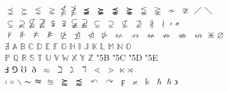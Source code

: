 \documentclass{article}
\begin{document}
$\precnsim$ $\succnsim$ $\lnsim$ $\gnsim$ $\nleqq$ $\ngeqq$ $\precneqq$ $\succneqq$ $\precnapprox$ $\succnapprox$ $\lnapprox$ $\gnapprox$ $\nsim$ $\ncong$ $\diagup$ $\diagdown$\\
$\varsubsetneq$ $\varsupsetneq$ $\nsubseteqq$ $\nsupseteqq$ $\subsetneqq$ $\supsetneqq$ $\varsubsetneqq$ $\varsupsetneqq$ $\subsetneq$ $\supsetneq$ $\nsubseteq$ $\nsupseteq$ $\nparallel$ $\nmid$ $\nshortmid$ $\nshortparallel$\\
$\nvdash$ $\nVdash$ $\nvDash$ $\nVDash$ $\ntrianglerighteq$ $\ntrianglelefteq$ $\ntriangleleft$ $\ntriangleright$ $\nleftarrow$ $\nrightarrow$ $\nLeftarrow$ $\nRightarrow$ $\nLeftrightarrow$ $\nleftrightarrow$ $\divideontimes$ $\varnothing$\\
$\nexists$ $\mathbb{A}$ $\mathbb{B}$ $\mathbb{C}$ $\mathbb{D}$ $\mathbb{E}$ $\mathbb{F}$ $\mathbb{G}$ $\mathbb{H}$ $\mathbb{I}$ $\mathbb{J}$ $\mathbb{K}$ $\mathbb{L}$ $\mathbb{M}$ $\mathbb{N}$ $\mathbb{O}$\\
$\mathbb{P}$ $\mathbb{Q}$ $\mathbb{R}$ $\mathbb{S}$ $\mathbb{T}$ $\mathbb{U}$ $\mathbb{V}$ $\mathbb{W}$ $\mathbb{X}$ $\mathbb{Y}$ $\mathbb{Z}$ \selectfont\char"5B \selectfont\char"5C \selectfont\char"5D \selectfont\char"5E \\
$\Finv$ $\Game$ $\mho$ $\eth$ $\eqsim$ $\beth$ $\gimel$ $\daleth$ $\lessdot$ $\gtrdot$ $\ltimes$ $\rtimes$\\
$\shortmid$ $\shortparallel$ $\smallsetminus$ $\thicksim$ $\thickapprox$ $\approxeq$ $\succapprox$ $\precapprox$ $\curvearrowleft$ $\curvearrowright$ $\digamma$ $\varkappa$ $\Bbbk$ $\hslash$ $\hbar$ $\backepsilon$\\
\end{document}
